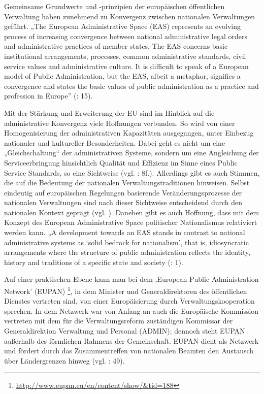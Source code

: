 Gemeinsame Grundwerte und -prinzipien der europäischen öffentlichen Verwaltung haben zunehmend zu Konvergenz zwischen nationalen Verwaltungen geführt. „The European Administrative Space (EAS) represents an evolving process of increasing convergence between national administrative legal orders and administrative practices of member states. The EAS concerns basic institutional arrangements, processes, common administrative standards, civil service values and administrative culture. It is difficult to speak of a European model of Public Administration, but the EAS, albeit a metaphor, signifies a convergence and states the basic values of public administration as a practice and profession in Europe” (\cite{oecd99}: 15). \par
Mit der Stärkung und Erweiterung der EU sind im Hinblick auf die administrative Konvergenz viele Hoffnungen verbunden. So wird von einer Homogenisierung der administrativen Kapazitäten ausgegangen, unter Einbezug nationaler und kultureller Besonderheiten. Dabei geht es nicht um eine „Gleichschaltung“ der administrativen Systeme, sondern um eine Angleichung der Serviceerbringung hinsichtlich Qualität und Effizienz im Sinne eines Public Service Standards, so eine Sichtweise (vgl. \cite{dorta}: 8f.). Allerdings gibt es auch Stimmen, die auf die Bedeutung der nationalen Verwaltungstraditionen hinweisen. Selbst eindeutig auf europäischen Regelungen basierende Veränderungsprozesse der nationalen Verwaltungen sind nach dieser Sichtweise entscheidend durch den nationalen Kontext geprägt (vgl. \cite{herit}). Daneben gibt es auch Hoffnung, dass mit dem Konzept des European Administrative Space politischer Nationalismus relativiert werden kann. „A development towards an EAS stands in contrast to national administrative systems as ‘solid bedrock for nationalism’, that is, idiosyncratic arrangements where the structure of public administration reflects the identity, history and traditions of a specific state and society (\cite{olsen}: 1).\par
Auf einer praktischen Ebene kann man bei dem ‚European Public Administration Network’ (EUPAN) \footnote{\url{http://www.eupan.eu/en/content/show/&tid=188}}, in dem Minister und Generaldirektoren des öffentlichen Dienstes vertreten sind, von einer Europäisierung durch Verwaltungskooperation sprechen. In dem Netzwerk war von Anfang an auch die Europäische Kommission vertreten mit dem für die Verwaltungsreform zuständigen Kommissar der Generaldirektion Verwaltung und Personal (ADMIN); dennoch steht EUPAN außerhalb des förmlichen Rahmens der Gemeinschaft. EUPAN dient als Netzwerk und fördert durch das Zusammentreffen von nationalen Beamten den Austausch über Ländergrenzen hinweg (vgl. \cite{mangenot}: 49).\par
